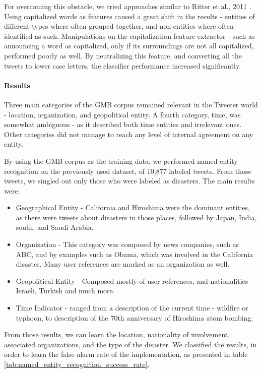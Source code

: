 \documentclass[letterpaper,twocolumn,10pt]{article}
\begin{document}
For overcoming this obstacle, we tried approaches similar to Ritter et al., 2011 \cite{Ritter11}. Using capitalized words as features caused a great shift in the results - entities of different types where often grouped together, and non-entities where often identified as such. Manipulations on the capitalization feature extractor - such as announcing a word as capitalized, only if its surroundings are not all capitalized, performed poorly as well. By neutralizing this feature, and converting all the tweets to lower case letters, the classifier performance increased significantly.

\paragraph{Results} Three main categories of the GMB corpus remained relevant in the Tweeter world - location, organization, and geopolitical entity. A fourth category, time, was somewhat ambiguous - as it described both time entities and irrelevant ones. Other categories did not manage to reach any level of internal agreement on any entity.

By using the GMB corpus as the training data, we performed named entity recognition on the previously used dataset, of 10,877 labeled tweets. From those tweets, we singled out only those who were labeled as disasters. The main results were:

\begin{itemize}[noitemsep, nolistsep]
	\item Geographical Entity - California and Hiroshima were the dominant entities, as there were tweets about disasters in those places, followed by Japan, India, south, and Saudi Arabia.
	\item Organization - This category was composed by news companies, such as ABC, and by examples such as Obama, which was involved in the California disaster. Many user references are marked as an organization as well.
	\item Geopolitical Entity - Composed mostly of user references, and nationalities - Israeli, Turkish and much more.
	\item Time Indicator - ranged from a description of the current time - wildfire or typhoon, to description of the 70th anniversary of Hiroshima atom bombing.
\end{itemize}
From those results, we can learn the location, nationality of involvement, associated organizations, and  the type of the disaster. We classified the results, in order to learn the false-alarm rate of the implementation, as presented in table  \ref{tab:named_entity_recognition_success_rate}.
\end{document}
